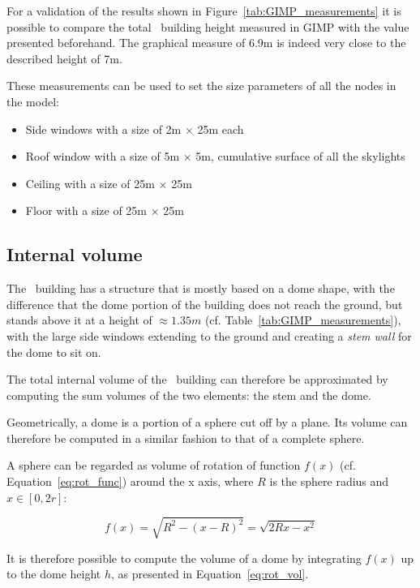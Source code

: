 For a validation of the results shown in Figure~\ref{tab:GIMP_measurements} it
is possible to compare the total \pdome\ building height measured in GIMP with
the value presented beforehand. The graphical measure of 6.9m is indeed very
close to the described height of 7m.

These measurements can be used to set the size parameters of all the nodes in
the model:

\begin{itemize}
    \item Side windows with a size of 2m $\times$ 25m each
    \item Roof window with a size of 5m $\times$ 5m, cumulative surface of all
        the skylights
    \item Ceiling with a size of 25m $\times$ 25m
    \item Floor with a size of 25m $\times$ 25m
\end{itemize}

\subsection{Internal volume}

The \pdome\ building has a structure that is mostly based on a dome shape, with
the difference that the dome portion of the building does not reach the ground,
but stands above it at a height of $\approx 1.35m$ (cf.
Table~\ref{tab:GIMP_measurements}), with the large side windows extending to the
ground and creating a \textit{stem wall} for the dome to sit on.

The total internal volume of the \pdome\ building can therefore be approximated
by computing the sum volumes of the two elements: the stem and the dome.

Geometrically, a dome is a portion of a sphere cut off by a plane. Its volume
can therefore be computed in a similar fashion to that of a complete sphere.

A sphere can be regarded as volume of rotation of function $f(x)$ (cf.
Equation~\ref{eq:rot_func}) around the x axis, where $R$ is the sphere radius
and $x \in [0, 2r]$: 

\begin{equation}\label{eq:rot_func}
    f(x) = \sqrt{R^2 - (x-R)^2} = \sqrt{2Rx - x^2}
\end{equation}

It is therefore possible to compute the volume of a dome by integrating $f(x)$
up to the dome height $h$, as presented in Equation~\ref{eq:rot_vol}. 

